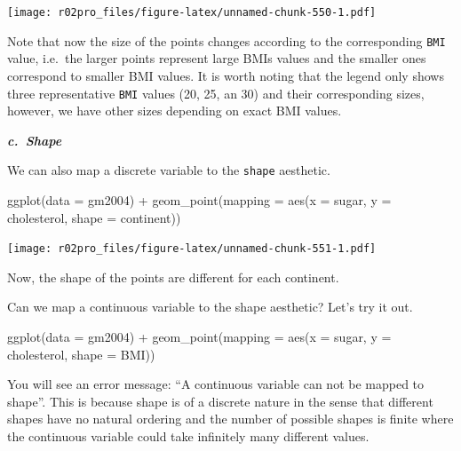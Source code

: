 \documentclass[
]{book}
\newenvironment{Shaded}{\begin{snugshade}}{\end{snugshade}}
\newcommand{\AttributeTok}[1]{\textcolor[rgb]{0.77,0.63,0.00}{#1}}
\newcommand{\FunctionTok}[1]{\textcolor[rgb]{0.00,0.00,0.00}{#1}}
\newcommand{\NormalTok}[1]{#1}
\newcommand{\SpecialCharTok}[1]{\textcolor[rgb]{0.00,0.00,0.00}{#1}}
\begin{document}
\texttt{[image: r02pro\_files/figure-latex/unnamed-chunk-550-1.pdf]}

Note that now the size of the points changes according to the corresponding \texttt{BMI} value, i.e.~the larger points represent large BMIs values and the smaller ones correspond to smaller BMI values. It is worth noting that the legend only shows three representative \texttt{BMI} values (20, 25, an 30) and their corresponding sizes, however, we have other sizes depending on exact BMI values.

\textbf{\emph{c.~Shape}}

We can also map a discrete variable to the \texttt{shape} aesthetic.

\begin{Shaded}
\begin{Highlighting}[]
\FunctionTok{ggplot}\NormalTok{(}\AttributeTok{data =}\NormalTok{ gm2004) }\SpecialCharTok{+} 
  \FunctionTok{geom\_point}\NormalTok{(}\AttributeTok{mapping =} \FunctionTok{aes}\NormalTok{(}\AttributeTok{x =}\NormalTok{ sugar, }
                           \AttributeTok{y =}\NormalTok{ cholesterol,}
                           \AttributeTok{shape =}\NormalTok{ continent))}
\end{Highlighting}
\end{Shaded}

\texttt{[image: r02pro\_files/figure-latex/unnamed-chunk-551-1.pdf]}

Now, the shape of the points are different for each continent.

Can we map a continuous variable to the shape aesthetic? Let's try it out.

\begin{Shaded}
\begin{Highlighting}[]
\FunctionTok{ggplot}\NormalTok{(}\AttributeTok{data =}\NormalTok{ gm2004) }\SpecialCharTok{+} 
  \FunctionTok{geom\_point}\NormalTok{(}\AttributeTok{mapping =} \FunctionTok{aes}\NormalTok{(}\AttributeTok{x =}\NormalTok{ sugar, }
                           \AttributeTok{y =}\NormalTok{ cholesterol,}
                           \AttributeTok{shape =}\NormalTok{ BMI))}
\end{Highlighting}
\end{Shaded}

You will see an error message: ``A continuous variable can not be mapped to shape''. This is because shape is of a discrete nature in the sense that different shapes have no natural ordering and the number of possible shapes is finite where the continuous variable could take infinitely many different values.
\end{document}
